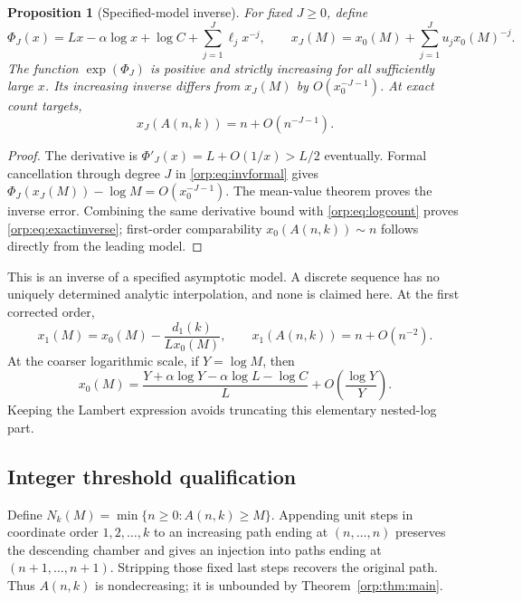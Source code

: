 \documentclass[11pt]{article}
\newtheorem{proposition}[theorem]{Proposition}
\theoremstyle{remark}\newtheorem{remark}[theorem]{Remark}
\begin{document}
\begin{proposition}[Specified-model inverse]\label{orp:prop:inverse}
For fixed $J\ge0$, define
\[
 \Phi_J(x)=Lx-\alpha\log x+\log C+\sum_{j=1}^J\ell_jx^{-j},
 \qquad x_J(M)=x_0(M)+\sum_{j=1}^Ju_jx_0(M)^{-j}.
\]
The function $\exp(\Phi_J)$ is positive and strictly increasing for all sufficiently large $x$. Its increasing inverse differs from $x_J(M)$ by $O(x_0^{-J-1})$. At exact count targets,
\begin{equation}\label{orp:eq:exactinverse}
 x_J(A(n,k))=n+O(n^{-J-1}).
\end{equation}
\end{proposition}
\begin{proof}
The derivative is $\Phi'_J(x)=L+O(1/x)>L/2$ eventually. Formal cancellation through degree $J$ in \eqref{orp:eq:invformal} gives
$\Phi_J(x_J(M))-\log M=O(x_0^{-J-1})$.
The mean-value theorem proves the inverse error. Combining the same derivative bound with \eqref{orp:eq:logcount} proves \eqref{orp:eq:exactinverse}; first-order comparability $x_0(A(n,k))\sim n$ follows directly from the leading model.
\end{proof}
This is an inverse of a specified asymptotic model. A discrete sequence has no uniquely determined analytic interpolation, and none is claimed here. At the first corrected order,
\[
 x_1(M)=x_0(M)-\frac{d_1(k)}{Lx_0(M)},\qquad
 x_1(A(n,k))=n+O(n^{-2}).
\]
At the coarser logarithmic scale, if $Y=\log M$, then
\[
 x_0(M)=\frac{Y+\alpha\log Y-\alpha\log L-\log C}{L}
       +O\left(\frac{\log Y}{Y}\right).
\]
Keeping the Lambert expression avoids truncating this elementary nested-log part.

\subsection{Integer threshold qualification}
Define $N_k(M)=\min\{n\ge0:A(n,k)\ge M\}$. Appending unit steps in coordinate order $1,2,\ldots,k$ to an increasing path ending at $(n,\ldots,n)$ preserves the descending chamber and gives an injection into paths ending at $(n+1,\ldots,n+1)$. Stripping those fixed last steps recovers the original path. Thus $A(n,k)$ is nondecreasing; it is unbounded by Theorem~\ref{orp:thm:main}.
\end{document}
